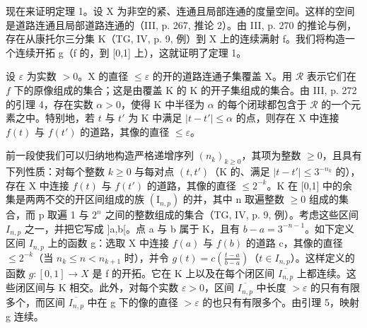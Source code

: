 现在来证明定理 1。设 X 为非空的紧、连通且局部连通的度量空间。这样的空间是道路连通且局部道路连通的（III, p. 267, 推论 2）。由 III, p. 270 的推论与例，存在从康托尔三分集 K（TG, IV, p. 9, 例）到 X 上的连续满射 f。我们将构造一个连续开拓 g（f 的，到 {[}0,1{]} 上），这就证明了定理 1。

设 \(\varepsilon\) 为实数 \(>0\)。X 的直径 \(\leqslant \varepsilon\) 的开的道路连通子集覆盖 X。用 \(\mathcal{R}\) 表示它们在 \(f\) 下的原像组成的集合；这是由覆盖 K 的 K 的开子集组成的集合。由 III, p. 272 的引理 4，存在实数 \(\alpha > 0\)，使得 K 中半径为 \(\alpha\) 的每个闭球都包含于 \(\mathcal{R}\) 的一个元素之中。特别地，若 \(t\) 与 \(t'\) 为 K 中满足 \(|t - t'| \leqslant \alpha\) 的点，则存在 X 中连接 \(f(t)\) 与 \(f(t')\) 的道路，其像的直径 \(\leqslant \varepsilon\)。

前一段使我们可以归纳地构造严格递增序列 \((n_{k})_{k\geqslant0}\)，其项为整数 \(\geqslant0\)，且具有下列性质：对每个整数 \(k\geqslant0\) 与每对点 \((t,t')\)（K 的、满足 \(|t-t'| \leqslant3^{-n_{k}}\) 的），存在 X 中连接 \(f(t)\) 与 \(f(t')\) 的道路，其像的直径 \(\leqslant2^{-k}\)。K 在 {[}0,1{]} 中的余集是两两不交的开区间组成的族 \((\mathrm{I}_{n,p})\) 的并，其中 n 取遍整数 \(\geqslant0\) 组成的集合，而 p 取遍 1 与 \(2^{n}\) 之间的整数组成的集合（TG, IV, p. 9, 例）。考虑这些区间 \(I_{n,p}\) 之一，并把它写成 {]}a,b{[}。点 a 与 b 属于 K，且有 \(b-a=3^{-n-1}\)。如下定义区间 \(I_{n,p}\) 上的函数 g：选取 X 中连接 \(f(a)\) 与 \(f(b)\) 的道路 c，其像的直径 \(\leqslant2^{-k}\)（当 \(n_{k}\leqslant n<n_{k+1}\) 时），并令 \(g(t)=c(\frac{t-a}{b-a})\)（\(t\in I_{n,p}\)）。这样定义的函数 \(g\colon[0,1]\to X\) 是 f 的开拓。它在 K 上以及在每个闭区间 \(\overline{I_{n,p}}\) 上都连续。这些闭区间与 K 相交。此外，对每个实数 \(\varepsilon>0\)，区间 \(\overline{I_{n,p}}\) 中长度 \(>\varepsilon\) 的只有有限多个，而区间 \(\overline{I_{n,p}}\) 中在 g 下的像的直径 \(>\varepsilon\) 的也只有有限多个。由引理 5，映射 g 连续。
